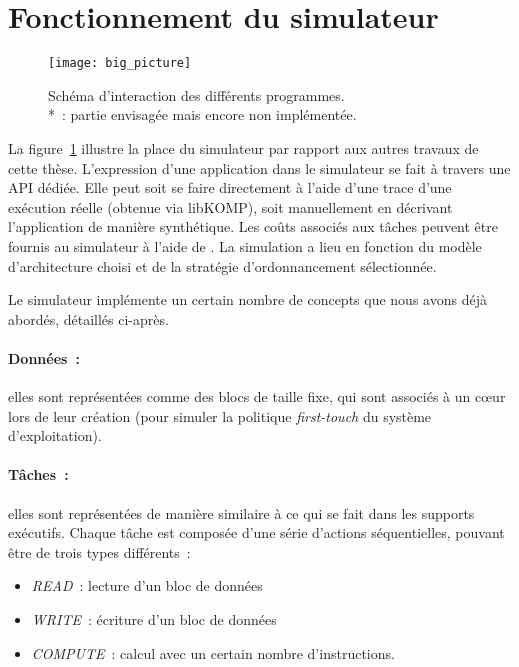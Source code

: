 \section{Fonctionnement du simulateur}\label{sec:simulation:archi}

\begin{figure}[h!]
  \centering
  \texttt{[image: big\_picture]}
  \caption{Schéma d'interaction des différents programmes.\\ *~: partie envisagée mais encore non implémentée.}\label{fig:simu:big_picture}
\end{figure}

La figure~\ref{fig:simu:big_picture} illustre la place du simulateur par rapport aux autres travaux de cette thèse.
L'expression d'une application dans le simulateur se fait à travers une API dédiée.
Elle peut soit se faire directement à l'aide d'une trace d'une exécution réelle (obtenue via libKOMP), soit manuellement en décrivant l'application de manière synthétique.
Les coûts associés aux tâches peuvent être fournis au simulateur à l'aide de \outil.
La simulation a lieu en fonction du modèle d'architecture choisi et de la stratégie d'ordonnancement sélectionnée.

Le simulateur implémente un certain nombre de concepts que nous avons déjà abordés, détaillés ci-après.

\paragraph{Données~:} elles sont représentées comme des blocs de taille fixe, qui sont associés à un cœur lors de leur création (pour simuler la politique \emph{first-touch} du système d'exploitation).

\paragraph{Tâches~:} elles sont représentées de manière similaire à ce qui se fait dans les supports exécutifs.
Chaque tâche est composée d'une série d'actions séquentielles, pouvant être de trois types différents~:
\begin{itemize}
  \item \emph{READ}~: lecture d'un bloc de données
  \item \emph{WRITE}~: écriture d'un bloc de données
  \item \emph{COMPUTE}~: calcul avec un certain nombre d'instructions.
\end{itemize}

